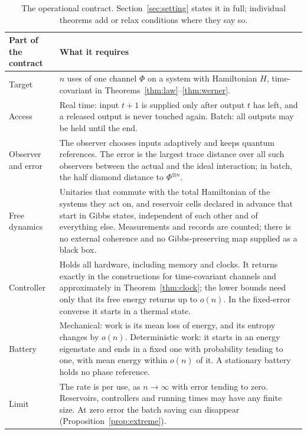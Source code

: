 \documentclass[11pt]{article}
\theoremstyle{definition}
\theoremstyle{remark}
\begin{document}
\begin{table}[t]
\centering
\small
\begin{tabular}{@{}>{\raggedright\arraybackslash}p{2.6cm}>{\raggedright\arraybackslash}p{12.2cm}@{}}
\toprule
Part of the contract & What it requires\\
\midrule
Target & $n$ uses of one channel $\Phi$ on a system with Hamiltonian $H$, time-covariant in Theorems~\ref{thm:law}--\ref{thm:werner}.\\
Access & Real time: input $t+1$ is supplied only after output $t$ has left, and a released output is never touched again. Batch: all outputs may be held until the end.\\
Observer and error & The observer chooses inputs adaptively and keeps quantum references. The error is the largest trace distance over all such observers between the actual and the ideal interaction; in batch, the half diamond distance to $\Phi^{\otimes n}$.\\
Free dynamics & Unitaries that commute with the total Hamiltonian of the systems they act on, and reservoir cells declared in advance that start in Gibbs states, independent of each other and of everything else. Measurements and records are counted; there is no external coherence and no Gibbs-preserving map supplied as a black box.\\
Controller & Holds all hardware, including memory and clocks. It returns exactly in the constructions for time-covariant channels and approximately in Theorem~\ref{thm:clock}; the lower bounds need only that its free energy returns up to $o(n)$. In the fixed-error converse it starts in a thermal state.\\
Battery & Mechanical: work is its mean loss of energy, and its entropy changes by $o(n)$. Deterministic work: it starts in an energy eigenstate and ends in a fixed one with probability tending to one, with mean energy within $o(n)$ of it. A stationary battery holds no phase reference.\\
Limit & The rate is per use, as $n\to\infty$ with error tending to zero. Reservoirs, controllers and running times may have any finite size. At zero error the batch saving can disappear (Proposition~\ref{prop:extreme}).\\
\bottomrule
\end{tabular}
\caption{The operational contract. Section~\ref{sec:setting} states it in full; individual theorems add or relax conditions where they say so.}\label{tab:contract}
\end{table}
\end{document}
